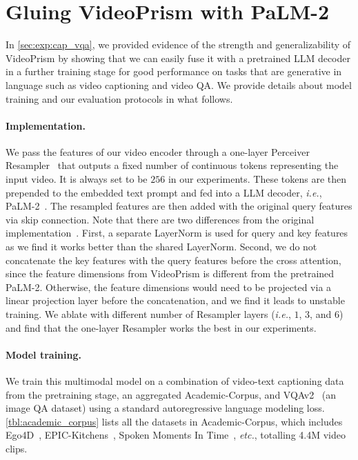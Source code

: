 \documentclass{article}
\theoremstyle{plain}
\theoremstyle{definition}
\theoremstyle{remark}
\newcommand{\OURS}{VideoPrism\xspace}
\newcommand{\ie}{\textit{i.e.}\xspace}
\newcommand{\etc}{\textit{etc.}\xspace}
\begin{document}
\section{Gluing \OURS with PaLM-2}
\label{app:videoulm}
 
In \cref{sec:exp:cap_vqa}, we provided evidence of the strength and generalizability of \OURS by showing that we can easily fuse it with a pretrained LLM decoder in a further training stage for good performance on tasks that are generative in language such as video captioning and video QA. We provide details about model training and our evaluation protocols in what follows.   

\paragraph{Implementation.} We pass the features of our video encoder through a one-layer Perceiver Resampler~\cite{alayrac2022flamingo} that outputs a fixed number of continuous tokens representing the input video. It is always set to be $256$ in our experiments. These tokens are then prepended to the embedded text prompt and fed into a LLM decoder, \ie, PaLM-2~\cite{anil2023palm}. The resampled features are then added with the original query features via skip connection. Note that there are two differences from the original implementation~\cite{alayrac2022flamingo}. First, a separate LayerNorm is used for query and key features as we find it works better than the shared LayerNorm. Second, we do not concatenate the key features with the query features before the cross attention, since the feature dimensions from \OURS is different from the pretrained PaLM-2. Otherwise, the feature dimensions would need to be projected via a linear projection layer before the concatenation, and we find it leads to unstable training. We ablate with different number of Resampler layers (\ie, $1$, $3$, and $6$) and find that the one-layer Resampler works the best in our experiments.

\paragraph{Model training.}
We train this multimodal model on a combination of video-text captioning data from the pretraining stage, an aggregated Academic-Corpus, and VQAv2~\cite{goyal2017making} (an image QA dataset) using a standard autoregressive language modeling loss.  \cref{tbl:academic_corpus} lists all the datasets in Academic-Corpus, which includes Ego4D~\cite{grauman2022ego4d}, EPIC-Kitchens~\cite{dima2022rescaling}, Spoken Moments In Time~\cite{monfort2021spoken}, \etc, totalling 4.4M video clips. 
\end{document}
